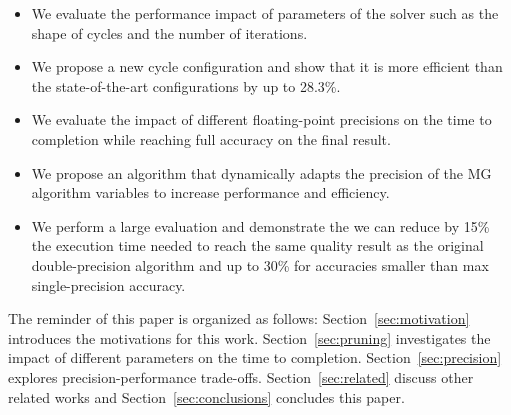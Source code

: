 \begin{itemize}

    \item We evaluate the performance impact of parameters of the solver such as the shape
        of cycles and the number of iterations.

    \item We propose a new cycle configuration and show that it is more
        efficient than the state-of-the-art configurations by up to 28.3\%.

    \item We evaluate the impact of different floating-point precisions on
        the time to completion while reaching full accuracy on the final
        result.

    \item We propose an algorithm that dynamically adapts the precision of the
        MG algorithm variables to increase performance and efficiency.

    \item We perform a large evaluation and demonstrate the we can reduce by
        15\% the execution time needed to reach the same quality result as the
        original double-precision algorithm and up to 30\% for accuracies smaller than max single-precision accuracy.

\end{itemize}


The reminder of this paper is organized as follows:
Section~\ref{sec:motivation} introduces the motivations for this work.
Section~\ref{sec:pruning} investigates the impact of different parameters on
the time to completion.  Section~\ref{sec:precision} explores
precision-performance trade-offs.  Section~\ref{sec:related} discuss other
related works and Section~\ref{sec:conclusions} concludes this paper.

